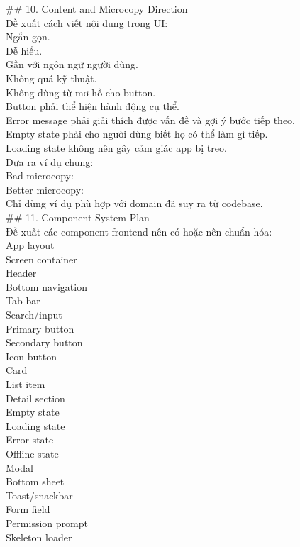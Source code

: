 \begin{enumerate}
\#\# 10. Content and Microcopy Direction \\

Đề xuất cách viết nội dung trong UI: \\
\* Ngắn gọn. \\
\* Dễ hiểu. \\
\* Gần với ngôn ngữ người dùng. \\
\* Không quá kỹ thuật. \\
\* Không dùng từ mơ hồ cho button. \\
\* Button phải thể hiện hành động cụ thể. \\
\* Error message phải giải thích được vấn đề và gợi ý bước tiếp theo. \\
\* Empty state phải cho người dùng biết họ có thể làm gì tiếp. \\
\* Loading state không nên gây cảm giác app bị treo. \\


Đưa ra ví dụ chung: \\
\* Bad microcopy: \\
\* Better microcopy: \\


Chỉ dùng ví dụ phù hợp với domain đã suy ra từ codebase. \\

\#\# 11. Component System Plan \\

Đề xuất các component frontend nên có hoặc nên chuẩn hóa: \\
\* App layout \\
\* Screen container \\
\* Header \\
\* Bottom navigation \\
\* Tab bar \\
\* Search/input \\
\* Primary button \\
\* Secondary button \\
\* Icon button \\
\* Card \\
\* List item \\
\* Detail section \\
\* Empty state \\
\* Loading state \\
\* Error state \\
\* Offline state \\
\* Modal \\
\* Bottom sheet \\
\* Toast/snackbar \\
\* Form field \\
\* Permission prompt \\
\* Skeleton loader \\



\end{enumerate}

